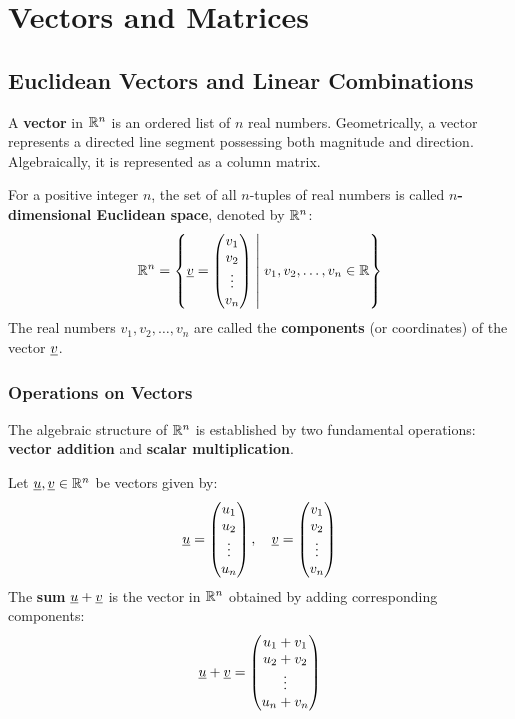 \chapter{Vectors and Matrices}

\section{Euclidean Vectors and Linear Combinations}

A \textbf{vector} in $\mathbb{R}^n$ is an ordered list of $n$ real numbers. Geometrically, a vector represents a directed line segment possessing both magnitude and direction. Algebraically, it is represented as a column matrix.

\begin{definition}
    For a positive integer $n$, the set of all $n$-tuples of real numbers is called \textbf{$n$-dimensional Euclidean space}, denoted by $\mathbb{R}^n$:
    \[
        \mathbb{R}^n = \left\{ \underline{v} = \begin{pmatrix} v_1 \\ v_2 \\ \vdots \\ v_n \end{pmatrix} \;\middle|\; v_1, v_2, \dots, v_n \in \mathbb{R} \right\}
    \]
    The real numbers $v_1, v_2, \dots, v_n$ are called the \textbf{components} (or coordinates) of the vector $\underline{v}$.
\end{definition}

\subsection*{Operations on Vectors}
The algebraic structure of $\mathbb{R}^n$ is established by two fundamental operations: \textbf{vector addition} and \textbf{scalar multiplication}.

\begin{definition}
    Let $\underline{u}, \underline{v} \in \mathbb{R}^n$ be vectors given by:
    \[
        \underline{u} = \begin{pmatrix} u_1 \\ u_2 \\ \vdots \\ u_n \end{pmatrix}, \quad 
        \underline{v} = \begin{pmatrix} v_1 \\ v_2 \\ \vdots \\ v_n \end{pmatrix}
    \]
    The \textbf{sum} $\underline{u} + \underline{v}$ is the vector in $\mathbb{R}^n$ obtained by adding corresponding components:
    \[
        \underline{u} + \underline{v} = \begin{pmatrix} u_1 + v_1 \\ u_2 + v_2 \\ \vdots \\ u_n + v_n \end{pmatrix}
    \]
\end{definition}

